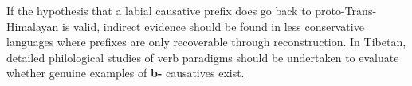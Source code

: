 \documentclass[oneside,a4paper,11pt]{article}
\newcommand{\ipa}[1]{\textbf{{\phon\mbox{#1}}}} %
\begin{document}
If the hypothesis that a labial causative prefix does go back to proto-Trans-Himalayan is valid, indirect evidence should be found in less conservative languages where prefixes are only recoverable through reconstruction. In Tibetan, detailed philological studies of verb paradigms should be undertaken to evaluate whether genuine examples of \ipa{b-} causatives exist. 
 
 \phon


\end{document}
